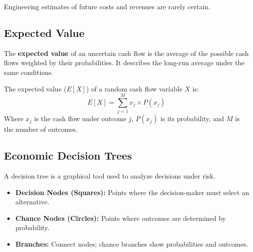 \documentclass[12pt,a4paper]{article}
\begin{document}
Engineering estimates of future costs and revenues are rarely certain.

\subsection{Expected Value}
\begin{tcolorbox}[defbox, title={Expected Value}]
The \textbf{expected value} of an uncertain cash flow is the average of the possible cash flows weighted by their probabilities. It describes the long-run average under the same conditions.
\end{tcolorbox}

\begin{tcolorbox}[formulabox, title={\textbf{Expected Value Formula}}]
The expected value ($E[X]$) of a random cash flow variable $X$ is:
\begin{equation}
  E[X] = \sum_{j=1}^{M} x_j \times P(x_j)
\end{equation}
Where $x_j$ is the cash flow under outcome $j$, $P(x_j)$ is its probability, and $M$ is the number of outcomes.
\end{tcolorbox}

\subsection{Economic Decision Trees}
A decision tree is a graphical tool used to analyze decisions under risk.
\begin{itemize}[leftmargin=*, itemsep=4pt]
  \item \textbf{Decision Nodes (Squares):} Points where the decision-maker must select an alternative.
  \item \textbf{Chance Nodes (Circles):} Points where outcomes are determined by probability.
  \item \textbf{Branches:} Connect nodes; chance branches show probabilities and outcomes.
\end{itemize}
\end{document}
